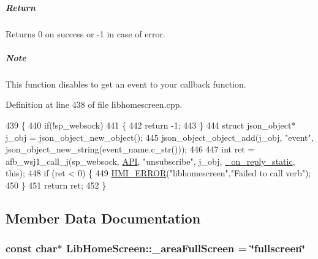 \subparagraph*{Return}


\begin{DoxyItemize}
\item Returns 0 on success or -\/1 in case of error.
\end{DoxyItemize}

\subparagraph*{Note}

This function disables to get an event to your callback function. 

Definition at line 438 of file libhomescreen.\+cpp.


\begin{DoxyCode}
439 \{
440     \textcolor{keywordflow}{if}(!sp\_websock)
441     \{
442         \textcolor{keywordflow}{return} -1;
443     \}
444     \textcolor{keyword}{struct }json\_object* j\_obj = json\_object\_new\_object();
445     json\_object\_object\_add(j\_obj, \textcolor{stringliteral}{"event"}, json\_object\_new\_string(event\_name.c\_str()));
446 
447     \textcolor{keywordtype}{int} ret = afb\_wsj1\_call\_j(sp\_websock, \hyperlink{libhomescreen_8cpp_a1e2d6e77dd8f0162f830058579eab42f}{API}, \textcolor{stringliteral}{"unsubscribe"}, j\_obj, 
      \hyperlink{libhomescreen_8cpp_a7778933bffa862c63fa0a1b8219faa8b}{\_on\_reply\_static}, \textcolor{keyword}{this});
448     \textcolor{keywordflow}{if} (ret < 0) \{
449         \hyperlink{include_2hmi-debug_8h_a65bb6c7cfe38f8a724beab5059d36fb2}{HMI\_ERROR}(\textcolor{stringliteral}{"libhomescreen"},\textcolor{stringliteral}{"Failed to call verb"});
450     \}
451     \textcolor{keywordflow}{return} ret;
452 \}
\end{DoxyCode}


\subsection{Member Data Documentation}
\subsubsection[{\texorpdfstring{\+\_\+area\+Full\+Screen}{_areaFullScreen}}]{\setlength{\rightskip}{0pt plus 5cm}const char$\ast$ Lib\+Home\+Screen\+::\+\_\+area\+Full\+Screen = \char`\"{}fullscreen\char`\"{}}\hypertarget{class_lib_home_screen_ad0569f5323ead77a43bd8735377a6f25}{}\label{class_lib_home_screen_ad0569f5323ead77a43bd8735377a6f25}


